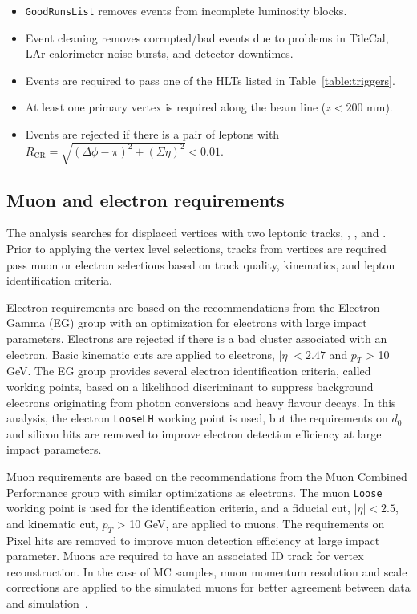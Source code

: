 \begin{itemize}
    \item \texttt{GoodRunsList} removes events from incomplete luminosity blocks.
    \item Event cleaning removes corrupted/bad events due to problems in TileCal, LAr calorimeter noise bursts, and detector downtimes.
    \item Events are required to pass one of the HLTs listed in Table~\ref{table:triggers}.
    \item At least one primary vertex is required along the beam line ($z<200$ \si{\mm}).
    \item Events are rejected if there is a pair of leptons with $R_{\mathrm{CR}} = \sqrt{(\Delta \phi - \pi)^{2} + (\Sigma \eta)^{2}} < 0.01$.
\end{itemize}



\subsection{Muon and electron requirements}
\label{sec:muon_electron_selection}

The analysis searches for displaced vertices with two leptonic tracks, \mumu, \ee, and \emu. Prior to applying the vertex level selections, tracks from vertices are required pass muon or electron selections based on track quality, kinematics, and lepton identification criteria. 

Electron requirements are based on the recommendations from the Electron-Gamma (EG) group with an optimization for electrons with large impact parameters. Electrons are rejected if there is a bad cluster associated with an electron. Basic kinematic cuts are applied to electrons, $|\eta| < 2.47$ and $p_{T}$ > 10 GeV. The EG group provides several electron identification criteria, called working points, based on a likelihood discriminant to suppress background electrons originating from photon conversions and heavy flavour decays. In this analysis, the electron \texttt{LooseLH} working point is used, but the requirements on $d_{0}$ and silicon hits are removed to improve electron detection efficiency at large impact parameters.

Muon requirements are based on the recommendations from the Muon Combined Performance group with similar optimizations as electrons. The muon \texttt{Loose} working point is used for the identification criteria, and a fiducial cut, $|\eta| < 2.5$, and kinematic cut, $p_{T}$ > 10 GeV, are applied to muons. The requirements on Pixel hits are removed to improve muon detection efficiency at large impact parameter. Muons are required to have an associated ID track for vertex reconstruction. In the case of MC samples, muon momentum resolution and scale corrections are applied to the simulated muons for better agreement between data and simulation~\cite{Aad:2016jkr}.

